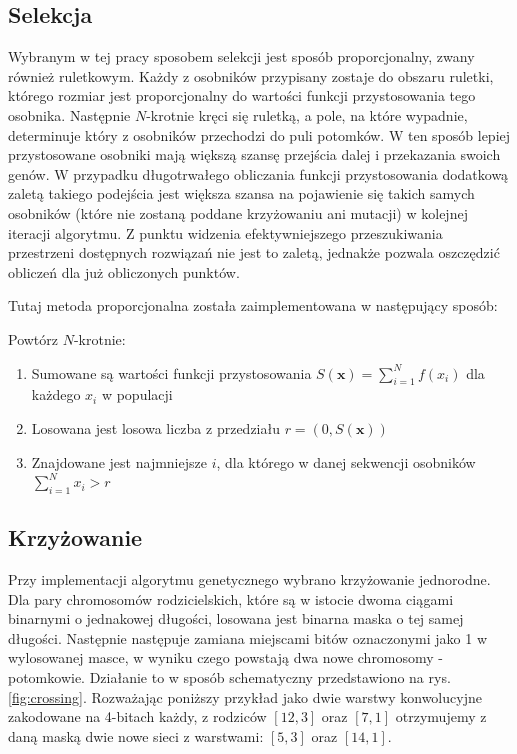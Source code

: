 \subsection{Selekcja}
Wybranym w tej pracy sposobem selekcji jest sposób proporcjonalny, zwany również ruletkowym.
Każdy z osobników przypisany zostaje do obszaru ruletki, którego rozmiar jest proporcjonalny do wartości funkcji przystosowania tego osobnika.
Następnie $N$-krotnie kręci się ruletką, a pole, na które wypadnie, determinuje który z osobników przechodzi do puli potomków.
W ten sposób lepiej przystosowane osobniki mają większą szansę przejścia dalej i przekazania swoich genów.
W przypadku długotrwałego obliczania funkcji przystosowania dodatkową zaletą takiego podejścia jest większa szansa na pojawienie się takich samych osobników (które nie zostaną poddane krzyżowaniu ani mutacji) w kolejnej iteracji algorytmu.
Z punktu widzenia efektywniejszego przeszukiwania przestrzeni dostępnych rozwiązań nie jest to zaletą, jednakże pozwala oszczędzić obliczeń dla już obliczonych punktów.

Tutaj metoda proporcjonalna została zaimplementowana w następujący sposób:

Powtórz $N$-krotnie:
\begin{enumerate}
  \item Sumowane są wartości funkcji przystosowania $S(\mathbf{x})=\sum_{i=1}^{N}f(x_i)$ dla każdego $x_i$ w populacji
  \item Losowana jest losowa liczba z przedziału $r = (0,S(\mathbf{x}))$
  \item Znajdowane jest najmniejsze $i$, dla którego w danej sekwencji osobników $\sum_{i=1}^{N}x_i > r $
\end{enumerate}

\subsection{Krzyżowanie}
Przy implementacji algorytmu genetycznego wybrano krzyżowanie jednorodne.
Dla pary chromosomów rodzicielskich, które są w istocie dwoma ciągami binarnymi o jednakowej długości, losowana jest binarna maska o tej samej długości.
Następnie następuje zamiana miejscami bitów oznaczonymi jako 1 w wylosowanej masce, w wyniku czego powstają dwa nowe chromosomy - potomkowie.
Działanie to w sposób schematyczny przedstawiono na rys. \ref{fig:crossing}.
Rozważając poniższy przykład jako dwie warstwy konwolucyjne zakodowane na 4-bitach każdy, z rodziców $[12,3]$ oraz $[7,1]$ otrzymujemy z daną maską dwie nowe sieci z warstwami: $[5,3]$ oraz $[14,1]$.

